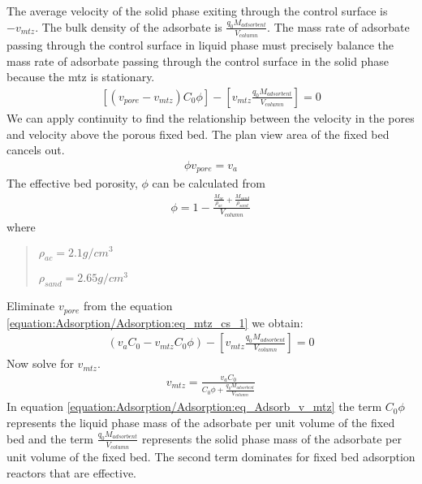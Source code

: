 \documentclass[letterpaper,10pt,english]{sphinxmanual}
\begin{document}
The average velocity of the solid phase exiting through the control surface is \(-v_{mtz}\). The bulk density of the adsorbate is \(\frac{q_0 M_{adsorbent}}{V_{column}}\). The mass rate of adsorbate passing through the control surface in liquid phase must precisely balance the mass rate of adsorbate passing through the control surface in the solid phase because the mtz is stationary.
\begin{equation}\label{equation:Adsorption/Adsorption:eq_mtz_cs_1}
\begin{split} [(v_{pore} - v_{mtz})C_0\phi] - \left[v_{mtz}\frac{q_0 M_{adsorbent}}{V_{column}}\right] = 0\end{split}
\end{equation}
We can apply continuity to find the relationship between the velocity in the pores and velocity above the porous fixed bed. The plan view area of the fixed bed cancels out.
\begin{equation}\label{equation:Adsorption/Adsorption:Adsorption/Adsorption:1}
\begin{split}\phi v_{pore} = v_a\end{split}
\end{equation}
The effective bed porosity, \(\phi\) can be calculated from
\begin{equation}\label{equation:Adsorption/Adsorption:Adsorption/Adsorption:2}
\begin{split}\phi =1 - \frac{\frac{M_{ac}}{\rho_{ac}} + \frac{M_{sand}}{\rho_{sand}}}{V_{column}}\end{split}
\end{equation}
where
\begin{quote}

\begin{DUlineblock}{0em}
\item[] \(\rho_{ac}  =  2.1 g/cm^3\)
\item[] \(\rho_{sand} = 2.65 g/cm^3\)
\end{DUlineblock}
\end{quote}

Eliminate \(v_{pore}\) from the equation \eqref{equation:Adsorption/Adsorption:eq_mtz_cs_1} we obtain:
\begin{equation}\label{equation:Adsorption/Adsorption:Adsorption/Adsorption:3}
\begin{split}(v_a C_0 - v_{mtz}C_0\phi) - \left[v_{mtz}\frac{q_0 M_{adsorbent}}{V_{column}}\right] = 0\end{split}
\end{equation}
Now solve for \(v_{mtz}\).
\begin{equation}\label{equation:Adsorption/Adsorption:eq_Adsorb_v_mtz}
\begin{split} v_{mtz}=\frac{v_a C_0}{C_0\phi + \frac{q_0 M_{adsorbent}}{V_{column}}}\end{split}
\end{equation}
In equation \eqref{equation:Adsorption/Adsorption:eq_Adsorb_v_mtz} the term \(C_0\phi\) represents the liquid phase mass of the adsorbate per unit volume of the fixed bed and the term \(\frac{q_0 M_{adsorbent}}{V_{column}}\) represents the solid phase mass of the adsorbate per unit volume of the fixed bed. The second term dominates for fixed bed adsorption reactors that are effective.
\end{document}
